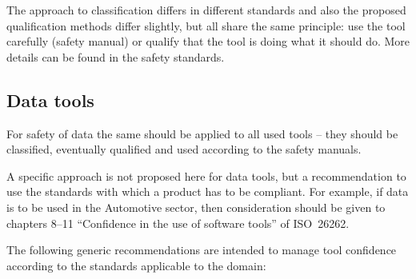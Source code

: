 The approach to classification differs in different standards and also the proposed qualification methods differ slightly,
but all share the same principle: use the tool carefully (safety manual) or qualify that the tool is doing what it should do.
More details can be found in the safety standards.

\subsection{Data tools}
 
For safety of data the same should be applied to all used tools -- they should be classified, eventually qualified and used according to the safety manuals.
 
A specific approach is not proposed here for data tools,
but a recommendation to use the standards with which a product has to be compliant.
For example, if data is to be used in the Automotive sector,
then consideration should be given to chapters 8--11 ``Confidence in the use of  software tools'' of ISO\ 26262.
 
The following generic recommendations are intended to manage tool confidence according to the standards applicable to the domain:

